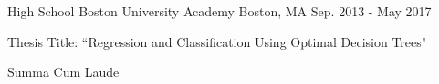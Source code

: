 \begin{cventries}
  \cventry
    {High School} %
    {Boston University Academy} %
    {Boston, MA} %
    {Sep. 2013 - May 2017} %
    {
      \begin{cvitems}
        \item {Thesis Title: ``Regression and Classification Using Optimal
        Decision Trees"}
        \item {Summa Cum Laude}
      \end{cvitems}
    }
    
\end{cventries}
